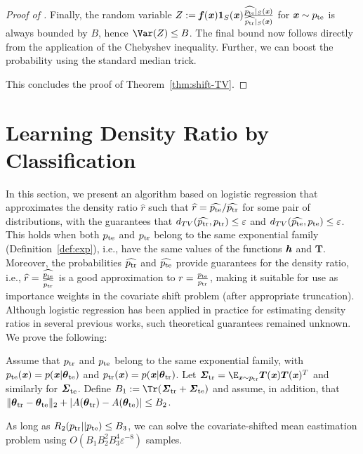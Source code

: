\begin{proof}[Proof of ]
    Finally, the random variable $Z :=\boldsymbol{\mathit{f}}(\boldsymbol{\mathit{x}})\mathbf{1}_S(\boldsymbol{\mathit{x}}) \frac{\widehat{p_{\mathrm{te}}}|_S(\boldsymbol{\mathit{x}})}{\widehat{p_{\mathrm{tr}}}|_S(\boldsymbol{\mathit{x}})}$ for $\boldsymbol{\mathit{x}} \sim p_{\mathrm{te}}$ is always bounded by $B$, hence $\Var(Z) \leq B$. The final bound now follows directly from the application of the Chebyshev inequality. Further, we can boost the probability using the standard median trick.
    
This concludes the proof of Theorem~\ref{thm:shift-TV}.
\end{proof}


\section{Learning Density Ratio by Classification}\label{sec:logistic}

In this section, we present an algorithm based on logistic regression that approximates the density ratio $\widehat{r}$ such that $\widehat{r} = \widehat{p_{\mathrm{te}}}/\widehat{p_{\mathrm{tr}}}$ for some pair of distributions, with the guarantees that $d_{TV}(\widehat{p_{\mathrm{tr}}}, p_{\mathrm{tr}}) \leq \varepsilon$ and $d_{TV}(\widehat{p_{\mathrm{te}}}, p_{\mathrm{te}}) \leq \varepsilon$. This holds when both $p_{\mathrm{te}}$ and $p_{\mathrm{tr}}$ belong to the same exponential family (Definition~\ref{def:exp}), i.e., have the same values of the functions $\boldsymbol{\mathit{h}}$ and $\boldsymbol{T}$. Moreover, the probabilities $\widehat{p_{\mathrm{tr}}}$ and $\widehat{p_{\mathrm{te}}}$ provide guarantees for the density ratio, i.e., $\widehat{r} = \frac{\widehat{p_{\mathrm{te}}}}{\widehat{p_{\mathrm{tr}}}}$ is a good approximation to $r = \frac{p_{\mathrm{te}}}{p_{\mathrm{tr}}}$, making it suitable for use as importance weights in the covariate shift problem (after appropriate truncation). Although logistic regression has been applied in practice for estimating density ratios in several previous works, such theoretical guarantees remained unknown. We prove the following:

\begin{theorem}
\label{thm:logistic-regression-result}
    Assume that $p_{\mathrm{tr}}$ and $p_{\mathrm{te}}$ belong to the same exponential family, with $p_{\mathrm{te}}(\boldsymbol{\mathit{x}}) = p(\boldsymbol{\mathit{x}} | \boldsymbol{\mathit{\theta}}_{\mathrm{te}})$ and $p_{\mathrm{tr}}(\boldsymbol{\mathit{x}}) = p(\boldsymbol{\mathit{x}} | \boldsymbol{\mathit{\theta}}_{\mathrm{tr}})$. Let $\str = \E_{\xx \sim \ptr} \boldsymbol{T}(\xx) \boldsymbol{T}(\xx)^{T}$ and similarly for $\boldsymbol{\mathit{\Sigma}}_{\mathrm{te}}$. Define $B_{1} := \Tr (\str + \ste)$ and assume, in addition, that $\|\boldsymbol{\mathit{\theta}}_{\mathrm{tr}} - \boldsymbol{\mathit{\theta}}_{\mathrm{te}}\|_2 + |A(\boldsymbol{\mathit{\theta}}_{\mathrm{tr}}) - A(\boldsymbol{\mathit{\theta}}_{\mathrm{te}})| \leq B_{2}$.
    
    As long as $R_2(p_{\mathrm{tr}} || p_{\mathrm{te}}) \leq B_3$, we can solve the covariate-shifted mean eastimation problem using $O(B_1 B_2^2 B_3^4 \varepsilon^{-8})$ samples.
\end{theorem}

